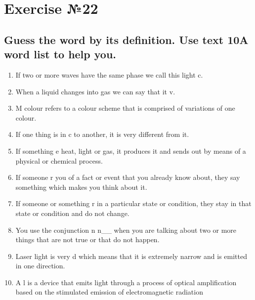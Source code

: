 \section{Exercise №22}
\subsection*{Guess the word by its definition. Use text 10A word list to help you.}
\begin{enumerate}
      \item If two or more waves have the same phase we call this light
            c\underline{\hspace{2cm}}.
      \item When a liquid changes into gas we can say that it v\underline{\hspace{2cm}}.
      \item M\underline{\hspace{2cm}} colour refers to a colour scheme that is
            comprised of variations of one colour.
      \item If one thing is in c\underline{\hspace{2cm}} to another, it is very
            different from it.
      \item If something e\underline{\hspace{2cm}} heat, light or gas, it produces it
            and sends out by means of a physical or chemical process.
      \item If someone r\underline{\hspace{2cm}} you of a fact or event that you
            already know about, they say something which makes you think about it.
      \item If someone or something r\underline{\hspace{2cm}} in a particular state
            or condition, they stay in that state or condition and do not change.
      \item You use the conjunction n\underline{\hspace{2cm}} n\_\_ when you are
            talking about two or more things that are not true or that do not happen.
      \item Laser light is very d\underline{\hspace{2cm}} which means that it is
            extremely narrow and is emitted in one direction.
      \item A l\underline{\hspace{2cm}} is a device that emits light through a process
            of optical amplification based on the stimulated emission of
            electromagnetic radiation
\end{enumerate}

